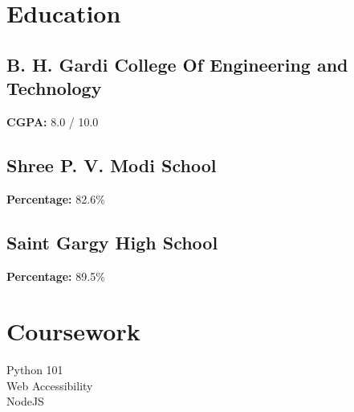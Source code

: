 \documentclass[letterpaper]{deedy-resume} %
\begin{document}
\begin{minipage}[t]{0.33\textwidth}
\sectionspace %


\section{Education} 

\subsection{B. H. Gardi College Of Engineering and Technology}

\textbf{CGPA:} 8.0 / 10.0

\sectionspace %

\subsection{Shree P. V. Modi School}

\textbf{Percentage:} 82.6\%

\sectionspace %

\subsection{Saint Gargy High School}

\textbf{Percentage:} 89.5\%

\sectionspace %





\section{Coursework}

Python 101 \\
Web Accessibility \\
NodeJS \\
\sectionspace %



\end{minipage} %
\end{document}
